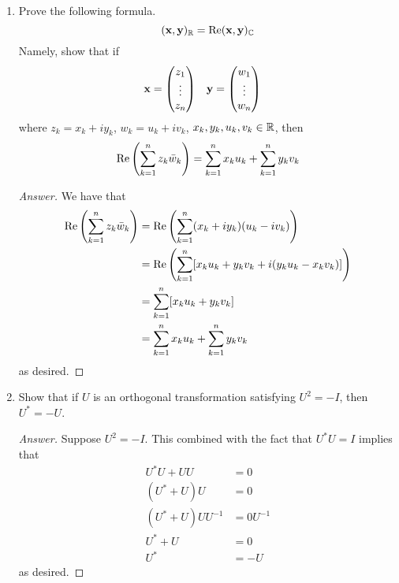 \documentclass[../psets.tex]{subfiles}
\begin{document}
\begin{enumerate}[label={\textbf{8.\arabic*.}}]
    \item Prove the following formula.
    \begin{equation*}
        (\mathbf{x},\mathbf{y})_{\mathbb{R}} = \operatorname{Re}(\mathbf{x},\mathbf{y})_{\mathbb{C}}
    \end{equation*}
    Namely, show that if
    \begin{align*}
        \mathbf{x} &=
        \begin{pmatrix}
            z_1\\
            \vdots\\
            z_n\\
        \end{pmatrix}&
        \mathbf{y} &=
        \begin{pmatrix}
            w_1\\
            \vdots\\
            w_n\\
        \end{pmatrix}
    \end{align*}
    where $z_k=x_k+iy_k$, $w_k=u_k+iv_k$, $x_k,y_k,u_k,v_k\in\mathbb{R}$, then
    \begin{equation*}
        \operatorname{Re}\left( \sum_{k=1}^nz_k\bar{w}_k \right) = \sum_{k=1}^nx_ku_k+\sum_{k=1}^ny_kv_k
    \end{equation*}
    \begin{proof}[Answer]
        We have that
        \begingroup
        \allowdisplaybreaks
        \begin{align*}
            \operatorname{Re}\left( \sum_{k=1}^nz_k\bar{w}_k \right) &= \operatorname{Re}\left( \sum_{k=1}^n(x_k+iy_k)(u_k-iv_k) \right)\\
            &= \operatorname{Re}\left( \sum_{k=1}^n[x_ku_k+y_kv_k+i(y_ku_k-x_kv_k)] \right)\\
            &= \sum_{k=1}^n[x_ku_k+y_kv_k]\\
            &= \sum_{k=1}^nx_ku_k+\sum_{k=1}^ny_kv_k
        \end{align*}
        \endgroup
        as desired.
    \end{proof}
    \setcounter{enumi}{3}
    \item Show that if $U$ is an orthogonal transformation satisfying $U^2=-I$, then $U^*=-U$.
    \begin{proof}[Answer]
        Suppose $U^2=-I$. This combined with the fact that $U^*U=I$ implies that
        \begin{align*}
            U^*U+UU &= 0\\
            (U^*+U)U &= 0\\
            (U^*+U)UU^{-1} &= 0U^{-1}\\
            U^*+U &= 0\\
            U^* &= -U
        \end{align*}
        as desired.
    \end{proof}
\end{enumerate}
\end{document}
